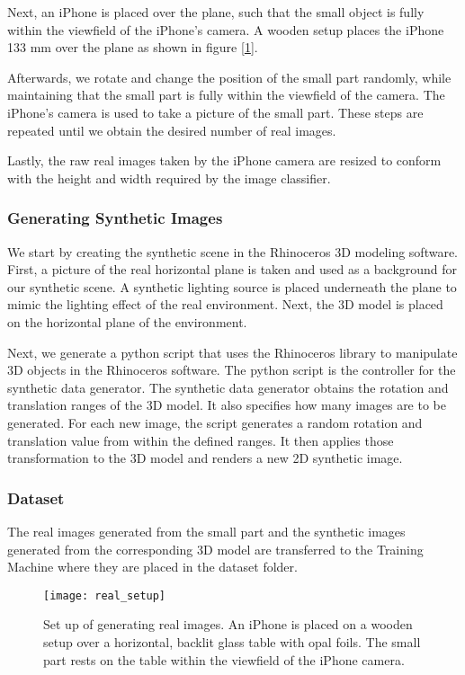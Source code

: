 Next, an iPhone is placed over the plane, such that the small object is fully within the viewfield of the iPhone's camera. A wooden setup places the iPhone 133 mm over the plane as shown in figure [\ref{fig:RealSetup}].

Afterwards, we rotate and change the position of the small part randomly, while maintaining that the small part is fully within the viewfield of the camera. The iPhone's camera is used to take a picture of the small part. These steps are repeated until we obtain the desired number of real images.

Lastly, the raw real images taken by the iPhone camera are resized to conform with the height and width required by the image classifier.

\subsubsection{Generating Synthetic Images}
We start by creating the synthetic scene in the Rhinoceros 3D modeling software. First, a picture of the real horizontal plane is taken and used as a background for our synthetic scene. A synthetic lighting source is placed underneath the plane to mimic the lighting effect of the real environment. Next, the 3D model is placed on the horizontal plane of the environment.

Next, we generate a python script that uses the Rhinoceros library to manipulate 3D objects in the Rhinoceros software. The python script is the controller for the synthetic data generator. The synthetic data generator obtains the rotation and translation ranges of the 3D model. It also specifies how many images are to be generated. For each new image, the script generates a random rotation and translation value from within the defined ranges. It then applies those transformation to the 3D model and renders a new 2D synthetic image.

\subsubsection{Dataset}
The real images generated from the small part and the synthetic images generated from the corresponding 3D model are transferred to the Training Machine where they are placed in the dataset folder.

\begin{figure}[H]
\centering
  \texttt{[image: real\_setup]}
\caption{Set up of generating real images. An iPhone is placed on a wooden setup over a horizontal, backlit glass table with opal foils. The small part rests on the table within the viewfield of the iPhone camera.}
\label{fig:RealSetup}
\end{figure}

